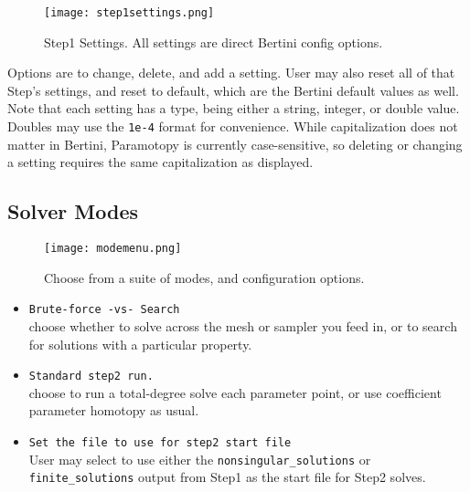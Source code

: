 \begin{figure}[h]
\begin{center}
\texttt{[image: step1settings.png]}
\caption[Step 1 Settings]{Step1 Settings.  All settings are direct Bertini config options.}
\label{screen:step1menu}
\end{center}
\end{figure}


Options are to change, delete, and add a setting.  User may also reset all of that Step's settings, and reset to default, which are the Bertini default values as well.  Note that each setting has a type, being either a string, integer, or double value.  Doubles may use the \texttt{1e-4} format for convenience.  While capitalization does not matter in Bertini, Paramotopy is currently case-sensitive, so deleting or changing a setting requires the same capitalization as displayed.




\subsection{Solver Modes}


\begin{figure}[h]
\begin{center}
\texttt{[image: modemenu.png]}
\caption[Solver Mode Menu]{ Choose from a suite of modes, and configuration options.}
\label{screen:modemenu}
\end{center}
\end{figure}



\begin{itemize}
	\item  {\tt Brute-force -vs- Search}  \\ choose whether to solve across the mesh or sampler you feed in, or to search for solutions with a particular property.
	\item {\tt Standard step2 run.} \\ choose to run a total-degree solve each parameter point, or use coefficient parameter homotopy as usual.
	\item \texttt{Set the file to use for step2 start file} \\ User may select to use either the \texttt{nonsingular\_solutions} or \texttt{finite\_solutions} output from Step1 as the start file for Step2 solves.
\end{itemize}

